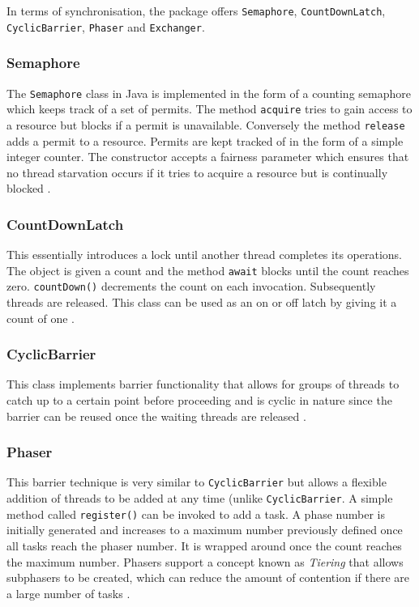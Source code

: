 \documentclass[12pt,a4paper,oneside]{article}
\def\code#1{\texttt{#1}}
\begin{document}
\begin{spacing}{1.4}
In terms of synchronisation, the package offers \code{Semaphore}, \code{CountDownLatch}, \code{CyclicBarrier}, \code{Phaser} and \code{Exchanger}. 

\subsubsection{Semaphore}
The \code{Semaphore} class in Java is implemented in the form of a counting semaphore which keeps track of a set of permits. The method \code{acquire} tries to gain access to a resource but blocks if a permit is unavailable. Conversely the method \code{release} adds a permit to a resource. Permits are kept tracked of in the form of a simple integer counter. The constructor accepts a fairness parameter which ensures that no thread starvation occurs if it tries to acquire a resource but is continually blocked \citep{JavaAPI}.

\subsubsection{CountDownLatch}
This essentially introduces a lock until another thread completes its operations. The object is given a count and the method \code{await} blocks until the count reaches zero. \code{countDown()} decrements the count on each invocation. Subsequently threads are released. This class can be used as an on or off latch by giving it a count of one \citep{JavaAPI}.

\subsubsection{CyclicBarrier}
This class implements barrier functionality that allows for groups of threads to catch up to a certain point before proceeding and is cyclic in nature since the barrier can be reused once the waiting threads are released \citep{JavaAPI}.

\subsubsection{Phaser}
This barrier technique is very similar to \code{CyclicBarrier} but allows a flexible addition of threads to be added at any time (unlike \code{CyclicBarrier}. A simple method called \code{register()} can be invoked to add a task. A phase number is initially generated and increases to a maximum number previously defined once all tasks reach the phaser number. It is wrapped around once the count reaches the maximum number. Phasers support a concept known as \textit{Tiering} that allows subphasers to be created, which can reduce the amount of contention if there are a large number of tasks \cite{JavaAPI}.


\end{spacing}
\end{document}
